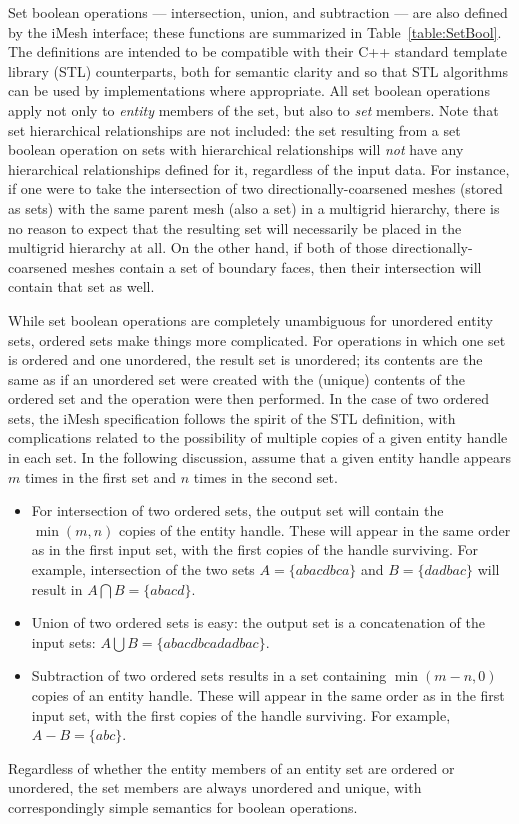 Set boolean operations --- intersection, union, and subtraction ---
are also defined by the iMesh interface; these functions are summarized
in Table~\ref{table:SetBool}. The definitions are intended to be
compatible with their C++ standard template library (STL) counterparts,
both for semantic clarity and so that STL algorithms can be used by
implementations where appropriate. All set boolean operations apply
not only to \emph{entity} members of the set, but also to \emph{set}
members. Note that set hierarchical relationships are not included:
the set resulting from a set boolean operation on sets with hierarchical
relationships will \emph{not} have any hierarchical relationships
defined for it, regardless of the input data. For instance, if one
were to take the intersection of two directionally-coarsened meshes
(stored as sets) with the same parent mesh (also a set) in a multigrid
hierarchy, there is no reason to expect that the resulting set will
necessarily be placed in the multigrid hierarchy at all. On the other
hand, if both of those directionally-coarsened meshes contain a set
of boundary faces, then their intersection will contain that set as
well.

While set boolean operations are completely unambiguous for unordered
entity sets, ordered sets make things more complicated. For operations
in which one set is ordered and one unordered, the result set is unordered;
its contents are the same as if an unordered set were created with
the (unique) contents of the ordered set and the operation were then
performed. In the case of two ordered sets, the iMesh specification
follows the spirit of the STL definition, with complications related
to the possibility of multiple copies of a given entity handle in
each set. In the following discussion, assume that a given entity
handle appears $m$ times in the first set and $n$ times in the second
set.

\begin{itemize}
\item For intersection of two ordered sets, the output set will contain
the $\min\left(m,n\right)$ copies of the entity handle. These will
appear in the same order as in the first input set, with the first
copies of the handle surviving. For example, intersection of the two
sets $A=\textrm{\{$abacdbca$\}}$ and $B=\{ dadbac\}$ will result
in $A\bigcap B=\{ abacd\}$. 
\item Union of two ordered sets is easy: the output set is a concatenation
of the input sets: $A\bigcup B=\{ abacdbcadadbac\}$. 
\item Subtraction of two ordered sets results in a set containing $\min\left(m-n,0\right)$
copies of an entity handle. These will appear in the same order as
in the first input set, with the first copies of the handle surviving.
For example, $A-B=\{ abc\}$. 
\end{itemize}
Regardless of whether the entity members of an entity set are ordered
or unordered, the set members are always unordered and unique, with
correspondingly simple semantics for boolean operations.


